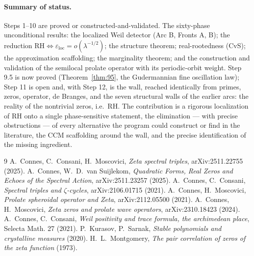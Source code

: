 \documentclass[11pt]{amsart}
\theoremstyle{definition}
\theoremstyle{remark}
\newcommand{\ve}{\varepsilon}
\newcommand{\loc}{\mathrm{loc}}
\begin{document}
\paragraph{Summary of status.} Steps 1--10 are proved or constructed-and-validated. The
sixty-phase unconditional results: the localized Weil detector (Arc B, Fronts A, B); the
reduction $\mathrm{RH}\iff\ve_\loc=o(\lambda^{-1/2})$; the structure theorem; real-rootedness
(CvS); the approximation scaffolding; the marginality theorem; and the construction and
validation of the semilocal prolate operator with its periodic-orbit weight. Step 9.5 is now
proved (Theorem~\ref{thm:95}, the Gudermannian fine oscillation law); Step 11 is open and,
with Step 12, is the wall, reached identically from primes, zeros,
operator, de Branges, and the seven structural walls of the earlier arcs: the reality of the
nontrivial zeros, i.e.\ RH. The contribution is a rigorous localization of RH onto a single
phase-sensitive statement, the elimination --- with precise obstructions --- of every
alternative the program could construct or find in the literature, the CCM scaffolding around
the wall, and the precise identification of the missing ingredient.

\begin{thebibliography}{9}
 A.~Connes, C.~Consani, H.~Moscovici, \emph{Zeta spectral triples}, arXiv:2511.22755 (2025).
 A.~Connes, W.~D.~van Suijlekom, \emph{Quadratic Forms, Real Zeros and Echoes of the Spectral Action}, arXiv:2511.23257 (2025).
 A.~Connes, C.~Consani, \emph{Spectral triples and $\zeta$-cycles}, arXiv:2106.01715 (2021).
 A.~Connes, H.~Moscovici, \emph{Prolate spheroidal operator and Zeta}, arXiv:2112.05500 (2021).
 A.~Connes, H.~Moscovici, \emph{Zeta zeros and prolate wave operators}, arXiv:2310.18423 (2024).
 A.~Connes, C.~Consani, \emph{Weil positivity and trace formula, the archimedean place}, Selecta Math. 27 (2021).
 P.~Kurasov, P.~Sarnak, \emph{Stable polynomials and crystalline measures} (2020).
 H.~L.~Montgomery, \emph{The pair correlation of zeros of the zeta function} (1973).
\end{thebibliography}
\end{document}
